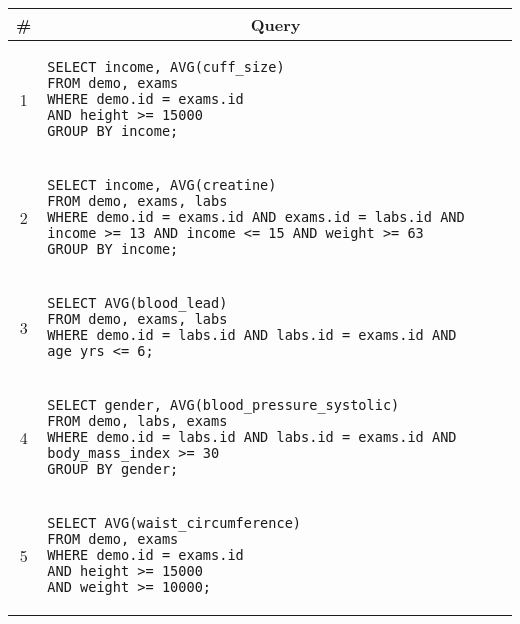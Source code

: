 \begin{tabular}{cl}
\toprule
\# & \multicolumn{1}{c}{Query} \\
\midrule
1 & 
\begin{minipage}{6in}
\begin{lstlisting}[breaklines]
SELECT income, AVG(cuff_size)
FROM demo, exams
WHERE demo.id = exams.id
AND height >= 15000
GROUP BY income;
\end{lstlisting}
\end{minipage}{queryno} \label[query]{q1} \\
2 & 
\begin{minipage}{6in}
\begin{lstlisting}[breaklines]
SELECT income, AVG(creatine)
FROM demo, exams, labs
WHERE demo.id = exams.id AND exams.id = labs.id AND income >= 13 AND income <= 15 AND weight >= 63
GROUP BY income;
\end{lstlisting}
\end{minipage}
{queryno} \label[query]{q2} \\
3 & 
\begin{minipage}{6in}
\begin{lstlisting}[breaklines]
SELECT AVG(blood_lead)
FROM demo, exams, labs
WHERE demo.id = labs.id AND labs.id = exams.id AND age_yrs <= 6;
\end{lstlisting}
\end{minipage}{queryno} \label[query]{q3}\\
4 & 
\begin{minipage}{6in}
\begin{lstlisting}[breaklines]
SELECT gender, AVG(blood_pressure_systolic)
FROM demo, labs, exams
WHERE demo.id = labs.id AND labs.id = exams.id AND body_mass_index >= 30
GROUP BY gender;
\end{lstlisting}
\end{minipage}{queryno} \label[query]{q4}\\
5 & 
\begin{minipage}{6in}
\begin{lstlisting}[breaklines]
SELECT AVG(waist_circumference)
FROM demo, exams
WHERE demo.id = exams.id 
AND height >= 15000
AND weight >= 10000;
\end{lstlisting}
\end{minipage}{queryno} \label{q5}\\
\bottomrule
\end{tabular}

